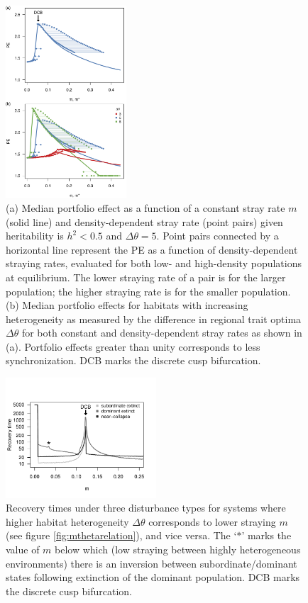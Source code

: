 \documentclass{revtex4}
\begin{document}
\begin{figure}
  \captionsetup{justification=raggedright,
singlelinecheck=false
}
\centering
\includegraphics[width=0.4\textwidth]{fig_thetaPEmvm.png}
\caption{
(a) Median portfolio effect as a function of a constant stray rate $m$ (solid line) and density-dependent stray rate (point pairs) given heritability is $h^2 < 0.5$ and $\Delta\theta=5$.
Point pairs connected by a horizontal line represent the PE as a function of density-dependent straying rates, evaluated for both low- and high-density populations at equilibrium. The lower straying rate of a pair is for the larger population; the higher straying rate is for the smaller population.
(b) Median portfolio effects for habitats with increasing heterogeneity as measured by the difference in regional trait optima $\Delta \theta$ for both constant and density-dependent stray rates as shown in (a).
Portfolio effects greater than unity corresponds to less synchronization.
DCB marks the discrete cusp bifurcation.
} \label{fig:thetaPE}
\end{figure}


\begin{figure}
  \captionsetup{justification=raggedright,
singlelinecheck=false
}
  \centering
  \includegraphics[width=0.5\textwidth]{fig_mtheta_rt.pdf}
  \caption{
  Recovery times under three disturbance types for systems where higher habitat heterogeneity $\Delta \theta$ corresponds to lower straying $m$ (see figure \ref{fig:mthetarelation}), and vice versa. 
  The `$*$' marks the value of $m$ below which (low straying between highly heterogeneous environments) there is an inversion between subordinate/dominant states following extinction of the dominant population.
  DCB marks the discrete cusp bifurcation.
  } \label{fig:mtheta}
\end{figure}
\end{document}
